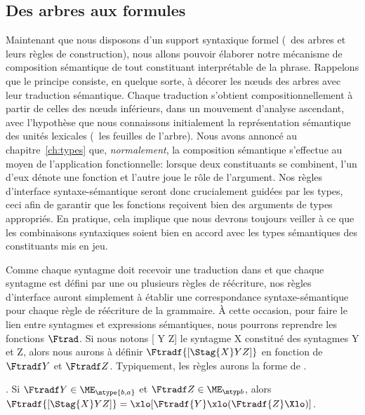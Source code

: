 \subsection{Des arbres aux formules}
\label{ss:Arbr2Form}

Maintenant que nous disposons d'un support syntaxique formel (\ie\ des arbres et leurs règles de construction), nous allons pouvoir élaborer notre mécanisme de composition sémantique de tout constituant interprétable de la phrase.  
Rappelons que le principe consiste, en quelque sorte, à décorer les n\oe uds des arbres avec leur traduction sémantique.  
Chaque traduction s'obtient compositionnellement à partir de celles des n\oe uds inférieurs, dans un mouvement d'analyse ascendant, avec l'hypothèse que nous connaissons initialement la représentation sémantique des unités lexicales (\ie\ les feuilles de l'arbre). 
Nous avons annoncé au chapitre~\ref{ch:types} que, \emph{normalement}, la composition sémantique s'effectue au moyen de l'application fonctionnelle: lorsque deux constituants se combinent, l'un d'eux dénote une fonction et l'autre joue le rôle de l'argument.  
Nos règles d'interface syntaxe-sémantique seront donc crucialement guidées par les types, ceci afin de garantir que les fonctions reçoivent bien des arguments de types appropriés. 
En pratique, cela implique que nous devrons toujours veiller à ce que les combinaisons syntaxiques soient bien en accord avec les types sémantiques des constituants mis en jeu.

Comme chaque syntagme doit recevoir une traduction dans {\LO} et que chaque syntagme est défini par une ou plusieurs règles de réécriture, nos règles d'interface auront simplement à établir une correspondance syntaxe-sémantique pour chaque règle de réécriture de la grammaire.
À cette occasion, pour faire le lien entre syntagmes et expressions sémantiques, nous pourrons reprendre les fonctions $\Ftrad$.  Si nous notons [ Y Z] le syntagme X constitué des syntagmes Y et Z, alors nous aurons à définir $\Ftradf{[\Stag{X} Y Z]}$ en fonction de $\Ftradf Y$ et $\Ftradf Z$.
Typiquement, les règles aurons la forme de \Next.

\ex.
Si $\Ftradf Y \in \ME_{\mtype{b,a}}$ et $\Ftradf Z \in \ME_{\mtyp b}$, alors
\(\Ftradf{[\Stag{X} Y Z]}=\xlo[\Ftradf{Y}\xlo(\Ftradf{Z}\Xlo)]\). %
\label{RIFtrad}


